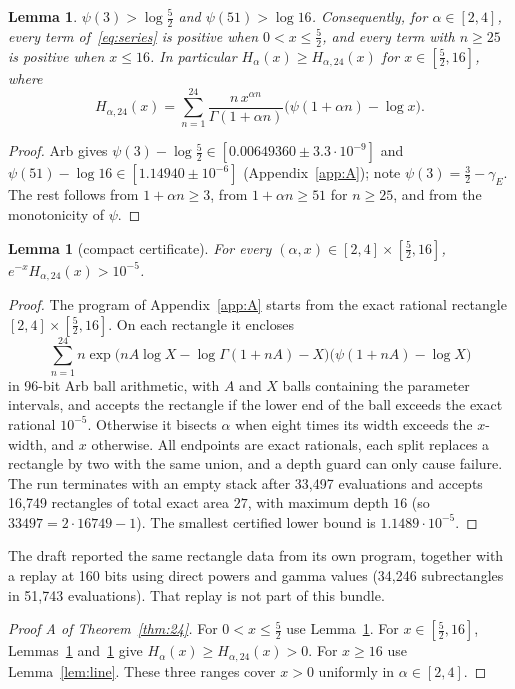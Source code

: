 \documentclass[11pt,a4paper]{article}
\theoremstyle{plain}
\newtheorem{lemma}[theorem]{Lemma}
\theoremstyle{remark}
\begin{document}
\begin{lemma}\label{lem:scalar}
$\psi(3)>\log\frac52$ and $\psi(51)>\log16$. Consequently, for $\alpha\in[2,4]$, every term
of~\eqref{eq:series} is positive when $0<x\le\frac52$, and every term with $n\ge25$ is positive
when $x\le16$. In particular $H_\alpha(x)\ge H_{\alpha,24}(x)$ for $x\in[\frac52,16]$, where
\[
 H_{\alpha,24}(x)=\sum_{n=1}^{24}\frac{n\,x^{\alpha n}}{\Gamma(1+\alpha n)}
 \bigl(\psi(1+\alpha n)-\log x\bigr).
\]
\end{lemma}
\begin{proof}
Arb gives $\psi(3)-\log\frac52\in[0.00649360\pm3.3\cdot10^{-9}]$ and
$\psi(51)-\log16\in[1.14940\pm10^{-6}]$ (Appendix~\ref{app:A}); note $\psi(3)=\frac32-\gamma_E$.
The rest follows from $1+\alpha n\ge3$, from $1+\alpha n\ge51$ for $n\ge25$, and from the
monotonicity of $\psi$.
\end{proof}

\begin{lemma}[compact certificate]\label{lem:certA}
For every $(\alpha,x)\in[2,4]\times[\frac52,16]$, $e^{-x}H_{\alpha,24}(x)>10^{-5}$.
\end{lemma}
\begin{proof}
The program of Appendix~\ref{app:A} starts from the exact rational rectangle
$[2,4]\times[\frac52,16]$. On each rectangle it encloses
\[
 \sum_{n=1}^{24}n\exp\bigl(nA\log X-\log\Gamma(1+nA)-X\bigr)\bigl(\psi(1+nA)-\log X\bigr)
\]
in 96-bit Arb ball arithmetic, with $A$ and $X$ balls containing the parameter intervals, and
accepts the rectangle if the lower end of the ball exceeds the exact rational $10^{-5}$.
Otherwise it bisects $\alpha$ when eight times its width exceeds the $x$-width, and $x$ otherwise.
All endpoints are exact rationals, each split replaces a rectangle by two with the same union, and
a depth guard can only cause failure. The run terminates with an empty stack after
33{,}497 evaluations and accepts 16{,}749 rectangles of total exact area $27$, with maximum depth
$16$ (so $33497=2\cdot16749-1$). The smallest certified lower bound is $1.1489\cdot10^{-5}$.
\end{proof}

The draft reported the same rectangle data from its own program, together with a replay at 160
bits using direct powers and gamma values (34{,}246 subrectangles in 51{,}743 evaluations). That
replay is not part of this bundle.

\begin{proof}[Proof A of Theorem~\ref{thm:24}]
For $0<x\le\frac52$ use Lemma~\ref{lem:scalar}. For $x\in[\frac52,16]$, Lemmas~\ref{lem:scalar}
and~\ref{lem:certA} give $H_\alpha(x)\ge H_{\alpha,24}(x)>0$. For $x\ge16$ use
Lemma~\ref{lem:line}. These three ranges cover $x>0$ uniformly in $\alpha\in[2,4]$.
\end{proof}
\end{document}
